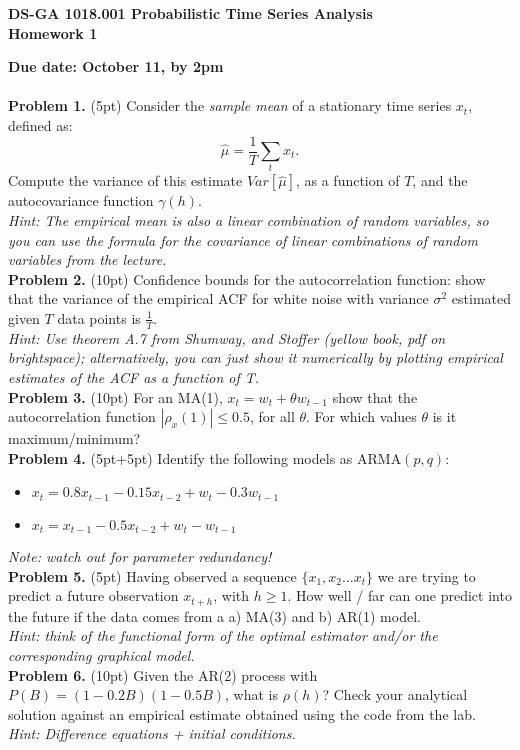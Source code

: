 \documentclass[12pt]{article}
\begin{document}
\thispagestyle{empty}
\begin{center}

\textbf{DS-GA 1018.001 Probabilistic Time Series Analysis\\
Homework 1}
\end{center}

\noindent \textbf{Due date: October 11, by 2pm}\\
\\
\noindent \textbf{Problem 1. }  (5pt) Consider the \emph{sample mean} of a stationary time series  $x_t$, defined as:
\begin{equation}
\hat{\mu} = \frac{1}{T} \sum_t x_t.
\end{equation}
Compute the variance of this estimate $Var[\hat{\mu}]$, as a function of $T$, and the autocovariance function $\gamma(h)$.\\
\emph{Hint: The empirical mean is also a linear combination of random variables, so you can use the formula for the covariance of linear combinations of random variables from the lecture. }\\

\noindent \textbf{Problem 2. } (10pt) Confidence bounds for the autocorrelation function: 
show that the variance of the empirical ACF for white noise with variance $\sigma^2$ estimated given $T$ data points is $\frac{1}{T}$.\\
\emph{Hint: Use theorem A.7 from Shumway, and  Stoffer  (yellow book, pdf on brightspace); alternatively, you can just show it numerically by plotting empirical estimates of the ACF as a function of T. }\\

\noindent \textbf{Problem 3. } (10pt)
For an MA(1), $x_t = w_t + \theta w_{t-1}$ show that the autocorrelation function $|\rho_x(1) | \leq 0.5$, for all $\theta$. 
For which values $\theta$ is it maximum/minimum?\\

\noindent \textbf{Problem 4.} (5pt+5pt) Identify the following models as $\mathrm{ARMA}(p,q)$:
\begin{itemize}
\item $x_t = 0.8 x_{t-1} - 0.15 x_{t-2} + w_t - 0.3 w_{t-1}$
\item $x_t =  x_{t-1} - 0.5 x_{t-2} + w_t - w_{t-1}$
\end{itemize}
\emph{Note: watch out for parameter redundancy!}\\

\noindent \textbf{Problem 5.} (5pt) Having observed a sequence  $\{x_1,x_2... x_t \}$ we are trying to predict a future observation $x_{t+h}$, with $h\geq1$.
How well / far can one predict into the future if the data comes from a a) MA(3) and b) AR(1) model. \\
\emph{Hint: think of the functional form of the optimal estimator and/or the corresponding graphical model.}\\

\noindent \textbf{Problem 6.} (10pt) Given the AR(2) process with $P(B) = (1-0.2B)(1-0.5B)$, what is $\rho(h)$? 
 Check your analytical solution against an empirical estimate obtained using the code from the lab.\\
\emph{Hint: Difference equations + initial conditions.}\\
\end{document}
